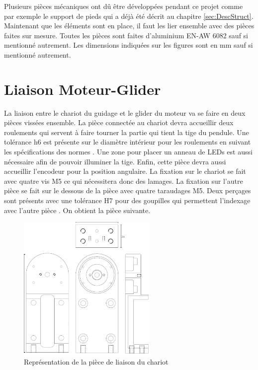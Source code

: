 Plusieurs pièces mécaniques ont dû être développées pendant ce projet comme par exemple le support de pieds  qui a déjà été décrit au chapitre \ref{sec:DescStruct}.
Maintenant que les éléments sont en place, il faut les lier ensemble avec des pièces faites sur mesure. Toutes les pièces sont faites
d'aluminium EN-AW 6082 sauf si mentionné autrement. Les dimensions indiquées sur les figures sont en mm sauf si mentionné autrement.

\section{Liaison Moteur-Glider}\label{sec:LiaisonMotGlid}
La liaison entre le chariot du guidage et le \gls{glider} du moteur va se faire en deux pièces vissées ensemble. La pièce
connectée au chariot devra accueillir deux roulements qui servent à faire tourner la partie qui tient la tige du pendule. Une tolérance h6 est
présente sur le diamètre intérieur pour les roulements en suivant les spécifications des normes \cite{Ajustements}. Une zone pour placer un anneau de LEDs est aussi nécessaire afin de pouvoir illuminer
la tige. Enfin, cette pièce devra aussi accueillir l'encodeur pour la position angulaire. La fixation sur le chariot se fait avec quatre vis M5
ce qui nécessitera donc des lamages. La fixation sur l'autre pièce se fait sur le dessous de la pièce avec quatre taraudages M5. Deux perçages
sont présents avec une tolérance H7 pour des goupilles qui permettent l'indexage avec l'autre pièce . On obtient la pièce suivante.

\begin{figure}[H]
    \centering
    \includegraphics[width = 0.6\textwidth]{assets/figures/LiaisonChariot.svg}
    \caption{Représentation de la pièce de liaison du chariot}
    \label{fig:LiaisonChariot}
\end{figure}

